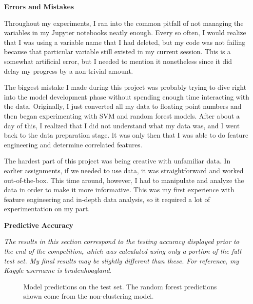 \documentclass{ws-ijprai}
\newcommand{\subheader}[1]{\bigskip\begin{center}\textbf{#1}\end{center}}
\begin{document}
\newpage
\subheader{Errors and Mistakes}

Throughout my experiments, I ran into the common pitfall of not managing the variables in my Jupyter notebooks neatly enough. Every so often, I would realize that I was using a variable name that I had deleted, but my code was not failing because that particular variable still existed in my current session. This is a somewhat artificial error, but I needed to mention it nonetheless since it did delay my progress by a non-trivial amount.

The biggest mistake I made during this project was probably trying to dive right into the model development phase without spending enough time interacting with the data. Originally, I just converted all my data to floating point numbers and then began experimenting with SVM and random forest models. After about a day of this, I realized that I did not understand what my data was, and I went back to the data preparation stage. It was only then that I was able to do feature engineering and determine correlated features.

The hardest part of this project was being creative with unfamiliar data. In earlier assignments, if we needed to use data, it was straightforward and worked out-of-the-box. This time around, however, I had to manipulate and analyze the data in order to make it more informative. This was my first experience with feature engineering and in-depth data analysis, so it required a lot of experimentation on my part.

\subheader{Predictive Accuracy}

\textit{The results in this section correspond to the testing accuracy displayed prior to the end of the competition, which was calculated using only a portion of the full test set. My final results may be slightly different than these. For reference, my Kaggle username is bradenhoagland.}

\begin{figure}[H]
  \centering
  \caption{Model predictions on the test set. The random forest predictions shown come from the non-clustering model.}
  \label{fig:preds}
\end{figure}
\end{document}
